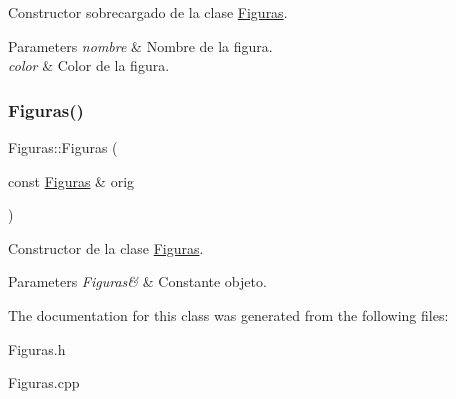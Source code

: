 Constructor sobrecargado de la clase \hyperlink{class_figuras}{Figuras}. 


\begin{DoxyParams}{Parameters}
{\em nombre} & Nombre de la figura. \\
\hline
{\em color} & Color de la figura. \\
\hline
\end{DoxyParams}
\hypertarget{class_figuras_aa5cb44be3f36d79786b13fc8d9a7da7f}{}\label{class_figuras_aa5cb44be3f36d79786b13fc8d9a7da7f} 
\subsubsection{\texorpdfstring{Figuras()}{Figuras()}\hspace{0.1cm}{\footnotesize\ttfamily [2/2]}}
{\ttfamily Figuras\+::\+Figuras (\begin{DoxyParamCaption}\item[{const \hyperlink{class_figuras}{Figuras} \&}]{orig }\end{DoxyParamCaption})}



Constructor de la clase \hyperlink{class_figuras}{Figuras}. 


\begin{DoxyParams}{Parameters}
{\em Figuras\&} & Constante objeto. \\
\hline
\end{DoxyParams}


The documentation for this class was generated from the following files\+:\begin{DoxyCompactItemize}
\item 
Figuras.\+h\item 
Figuras.\+cpp\end{DoxyCompactItemize}
